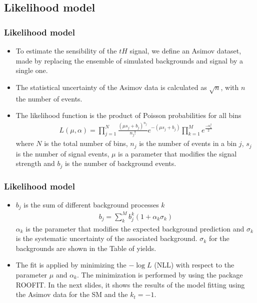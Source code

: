 \documentclass[11pt]{beamer}
\begin{document}
\begin{frame}
\subsection{Likelihood model}
\frametitle{Likelihood model}
{\small \begin{itemize}
\item To estimate the sensibility of the $tH$ signal, we define an Asimov dataset, made by replacing the ensemble of simulated backgrounds and signal by a single one. 
\item The statistical uncertainty of the Asimov data is calculated as $\sqrt{n}$, with $n$ the number of events.\\
\item The likelihood function is the product of Poisson probabilities for all bins
\begin{align}
	L(\mu,\alpha)=\prod_{j=1}^{N}\frac{(\mu s_j +b_j)^{n_j}}{n_j !}e^{-(\mu s_j+b_j)} \prod_{k=1}^M e^{\frac{-\alpha^2_k}{2}}
\end{align}
	where $N$ is the total number of bins, $n_j$ is the number of events in a bin $j$, $s_j$ is the number of signal events, $\mu$ is a parameter that modifies the signal strength and $b_j$ is the number of background events.
\end{itemize}}
\end{frame}


\begin{frame}
\frametitle{Likelihood model}
{\small
\begin{itemize}
	\item $b_j$ is the sum of different background processes $k$
	\begin{align}
	b_j=\sum_k^M b_j^k(1+ \alpha_k \sigma_k)
	\end{align}
	$\alpha_k$ is the parameter that modifies the expected background prediction and $\sigma_k$ is the systematic uncertainty of the associated background. $\sigma_k$ for the backgrounds are shown in the Table of yields. 
		\item The fit is applied by minimizing the $-\log{L}$ (NLL) with respect to the parameter $\mu$ and $\alpha_k$. The minimization is performed by using the package ROOFIT. In the next slides, it shows the results of the model fitting using the Asimov data for the SM and the $k_t=-1$.
\end{itemize}}
\end{frame}
\end{document}
